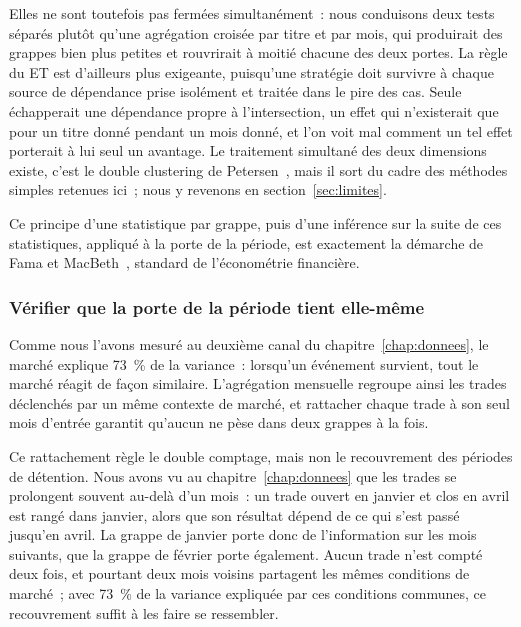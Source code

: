 Elles ne sont toutefois pas fermées simultanément~: nous conduisons deux tests
séparés plutôt qu'une agrégation croisée par titre et par mois, qui produirait
des grappes bien plus petites et rouvrirait à moitié chacune des deux portes.
La règle du ET est d'ailleurs plus exigeante, puisqu'une stratégie doit
survivre à chaque source de dépendance prise isolément et traitée dans le pire
des cas. Seule échapperait une dépendance propre à l'intersection, un effet
qui n'existerait que pour un titre donné pendant un mois donné, et l'on voit
mal comment un tel effet porterait à lui seul un avantage. Le traitement
simultané des deux dimensions existe, c'est le double clustering de
Petersen~\cite{petersen2009}, mais il sort du cadre des méthodes simples
retenues ici~; nous y revenons en section~\ref{sec:limites}.

Ce principe d'une statistique par grappe, puis d'une inférence sur la suite de
ces statistiques, appliqué à la porte de la période, est exactement la démarche
de Fama et MacBeth~\cite{famamacbeth1973}, standard de l'économétrie financière.



\subsubsection*{Vérifier que la porte de la période tient elle-même}

Comme nous l'avons mesuré au deuxième canal du chapitre~\ref{chap:donnees}, le
marché explique 73~\% de la variance~: lorsqu'un événement survient, tout le
marché réagit de façon similaire. L'agrégation mensuelle regroupe ainsi les
trades déclenchés par un même contexte de marché, et rattacher chaque trade à
son seul mois d'entrée garantit qu'aucun ne pèse dans deux grappes à la fois.

Ce rattachement règle le double comptage, mais non le recouvrement des périodes
de détention. Nous avons vu au chapitre~\ref{chap:donnees} que les trades se
prolongent souvent au-delà d'un mois~: un trade ouvert en janvier et clos en
avril est rangé dans janvier, alors que son résultat dépend de ce qui s'est
passé jusqu'en avril. La grappe de janvier porte donc de l'information sur les
mois suivants, que la grappe de février porte également. Aucun trade n'est
compté deux fois, et pourtant deux mois voisins partagent les mêmes conditions
de marché~; avec 73~\% de la variance expliquée par ces conditions communes, ce
recouvrement suffit à les faire se ressembler.

